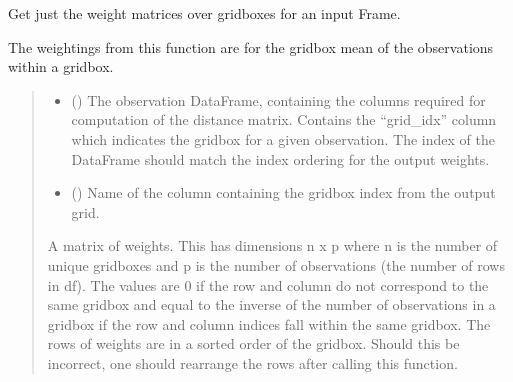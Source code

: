 \documentclass[letterpaper,10pt,english]{sphinxmanual}
\begin{document}

\begin{fulllineitems}
\label{\detokenize{error_covariance:glomar_gridding.error_covariance.get_weights}}
\pysigstartsignatures
\pysiglinewithargsret
{}
{\sphinxparamcomma {}}
{}
\pysigstopsignatures
\sphinxAtStartPar
Get just the weight matrices over gridboxes for an input Frame.

\sphinxAtStartPar
The weightings from this function are for the gridbox mean of the
observations within a gridbox.
\begin{quote}\begin{description}
\begin{itemize}
\item {}
\sphinxAtStartPar
{} () \textendash{} The observation DataFrame, containing the columns required for
computation of the distance matrix. Contains the “grid\_idx” column which
indicates the gridbox for a given observation. The index of the
DataFrame should match the index ordering for the output weights.

\item {}
\sphinxAtStartPar
{} () \textendash{} Name of the column containing the gridbox index from the output grid.

\end{itemize}

\sphinxAtStartPar
{} \textendash{} A matrix of weights. This has dimensions n x p where n is the number of
unique gridboxes and p is the number of observations (the number of rows
in df). The values are 0 if the row and column do not correspond to the
same gridbox and equal to the inverse of the number of observations in a
gridbox if the row and column indices fall within the same gridbox. The
rows of weights are in a sorted order of the gridbox. Should this be
incorrect, one should re\sphinxhyphen{}arrange the rows after calling this function.

\sphinxAtStartPar
{}

\end{description}\end{quote}

\end{fulllineitems}
\end{document}
